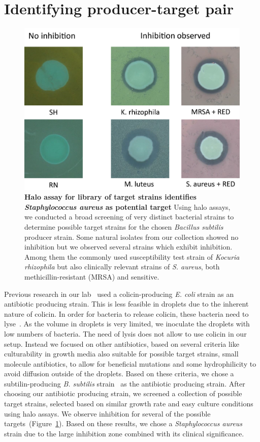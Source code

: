 \section{Identifying producer-target pair}
\begin{figure}
\centering
\includegraphics[width=\linewidth]{graphics/2025_09_30_droplets_fig7.png}
\caption{\textbf{Halo assay for library of target strains identifies \textit{Staphylococcus aureus} as potential target} Using halo assays, we conducted a broad screening of very distinct bacterial strains to determine possible target strains for the chosen \textit{Bacillus subtilis} producer strain. Some natural isolates from our collection showed no inhibition but we observed several strains which exhibit inhibition. Among them the commonly used susceptibility test strain of \textit{Kocuria rhizophila} but also clinically relevant strains of \textit{S. aureus}, both methicillin-resistant (MRSA) and sensitive.}
\label{fig:results_sensitive_screening}
\end{figure}
Previous research in our lab~\cite{Gerardin2016-ac} used a colicin-producing \textit{E. coli} strain as an antibiotic producing strain. This is less feasible in droplets due to the inherent nature of colicin. In order for bacteria to release colicin, these bacteria need to lyse~\cite{Cascales2007-oj}. As the volume in droplets is very limited, we inoculate the droplets with low numbers of bacteria. The need of lysis does not allow to use colicin in our setup.
Instead we focused on other antibiotics, based on several criteria like culturability in growth media also suitable for possible target strains, small molecule antibiotics, to allow for beneficial mutations and some hydrophilicity to avoid diffusion outside of the droplets. Based on these criteria, we chose a subtilin-producing \textit{B. subtilis} strain~\cite{Stein2002-nv, Zhang2022-ee} as the antibiotic producing strain.
After choosing our antibiotic producing strain, we screened a collection of possible target strains, selected based on similar growth rate and easy culture conditions using halo assays. We observe inhibition for several of the possible targets~(Figure~\ref{fig:results_sensitive_screening}). Based on these results, we chose a \textit{Staphylococcus aureus} strain due to the large inhibition zone combined with its clinical significance.

